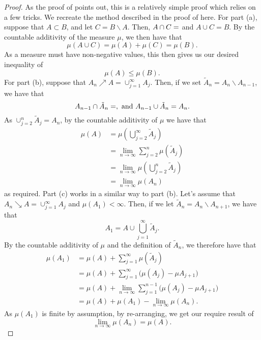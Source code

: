 \begin{proof}
  As the proof of {\cite[Theorem A.1]{teschl}} points out, this is a relatively simple proof which relies on a few tricks. We recreate the method described in the proof of {\cite[Theorem A.1]{teschl}} here. For part (a), suppose that $A \subset B$, and let $C = B \backslash A$. Then, $A \cap C = \empty$ and $A \cup C = B$. By the countable additivity of the measure $\mu$, we then have that
  \begin{equation*}
    \mu(A \cup C) = \mu(A) + \mu(C) = \mu(B).
  \end{equation*}
  As a measure must have non-negative values, this then gives us our desired inequality of
  \begin{equation*}
    \mu(A) \leq \mu(B).
  \end{equation*}
  For part (b), suppose that $A_n \nearrow A = \cup_{j=1}^{\infty}A_j$. Then, if we set $\tilde{A}_n = A_n \backslash A_{n-1}$, we have that
  \begin{equation*}
    A_{n-1} \cap \tilde{A}_n = \empty,\,\,\text{and}\,\,A_{n-1} \cup\tilde{A}_n = A_n.
  \end{equation*}
  As $\cup_{j=2}^{n}\tilde{A}_j = A_n$, by the countable additivity of $\mu$ we have that
  \begin{align*}
    \mu(A)
    &=
    \mu\left( \bigcup_{j=2}^{\infty}\tilde{A}_j \right) \\
    &=
    \lim_{n \to \infty} \sum_{j=2}^{n} \mu(\tilde{A}_j) \\
    &=
    \lim_{n \to \infty} \mu\left( \bigcup_{j=2}^{n}\tilde{A}_j \right) \\
    &=
    \lim_{n \to \infty} \mu(A_n)
  \end{align*}
  as required. Part (c) works in a similar way to part (b). Let's assume that $A_n \searrow A=\cup_{j=1}^{\infty}A_j$ and $\mu(A_1) < \infty$. Then, if we let $\tilde{A}_n = A_n \backslash A_{n+1}$, we have that
  \begin{equation*}
    A_1 = A \cup \bigcup_{j=1}^{\infty}\tilde{A}_j.
  \end{equation*}
  By the countable additivity of $\mu$ and the definition of $\tilde{A}_n$, we therefore have that
  \begin{align*}
    \mu(A_1)
    &=
    \mu(A) + \sum_{j=1}^{\infty} \mu(\tilde{A}_j) \\
    &=
    \mu(A) + \sum_{j=1}^{\infty} \big( \mu(A_j) - \mu{A_{j+1}} \big) \\
    &=
    \mu(A) + \lim_{n \to \infty} \sum_{j=1}^{n-1} \big( \mu(A_j) - \mu{A_{j+1}} \big) \\
    &= \mu(A) + \mu(A_1) - \lim_{n \to \infty}\mu(A_n).
  \end{align*}
  As $\mu(A_1)$ is finite by assumption, by re-arranging, we get our require result of
  \begin{equation*}
    \lim_{n \to \infty}\mu(A_n) = \mu(A).
  \end{equation*}
\end{proof}

